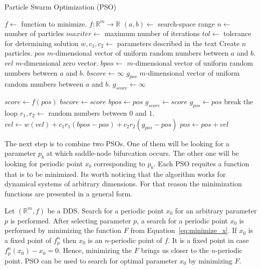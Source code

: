 \begin{algorithm}[!h]
    \caption{Particle Swarm Optimization (PSO)}
    \label{alg:pso}
    \begin{algorithmic}[1]
        \Statex $f \gets$ function to minimize. $f: \mathbb{R}^{m} \rightarrow \mathbb{R}$  
        \Statex $(a, b) \gets$ search-space range
        \Statex $n \gets$ number of particles
        \Statex $maxiter \gets$ maximum number of iterations
        \Statex $tol \gets$ tolerance for determining solution
        \Statex $w, c_{1}, c_{2} \gets$ parameters described in the text
        \State Create $n$ particles.
            \State $pos$ $m$-dimensional vector of uniform random numbers between $a$ and $b$.
            \State $vel$ $m$-dimensional zero vector.
            \State $bpos \gets$ $m$-dimensional vector of uniform random numbers between $a$ and $b$.
            \State $bscore \gets \infty$
        \EndFor
        \State $g_{pos}$ $m$-dimensional vector of uniform random numbers between $a$ and $b$.
        \State $g_{score} \gets \infty$

                \State $score \gets f(pos)$ 
                    \State $bscore \gets score$
                    \State $bpos \gets pos$
                \EndIf
                    \State $g_{score} \gets score$
                    \State $g_{pos} \gets pos$
                \EndIf
            \EndFor
                \State break the loop
            \EndIf
                \State $r_{1}, r_{2} \gets$ random numbers between $0$ and $1$.
                \State $vel \gets w(vel) + c_{1}r_{1}(bpos-pos) + c_{2}r_{2}(g_{pos}-pos)$
                \State $pos \gets pos + vel$
            \EndFor
        \EndFor
    \end{algorithmic}
\end{algorithm}

\par
The next step is to combine two PSOs.
One of them will be looking for a parameter $p_b$ at which saddle-node bifurcation occurs.
The other one will be looking for periodic point $x_b$ corresponding to $p_b$.
Each PSO requites a function that is to be minimized.
Its worth noticing that the algorithm works for dynamical systems of arbitrary dimensions.
For that reason the minimization functions are presented in a general form.
\par
Let $(\mathbb{R}^{m}, f)$ be a DDS.
Search for a periodic point $x_0$ for an arbitrary parameter $p$ is performed.
After selecting parameter $p$, a search for a periodic point $x_0$ is performed by minimizing the function $F$ from Equation~\eqref{eq:minimize_x}.
If $x_0$ is a fixed point of $f^{n}_{p}$ then $x_0$ is an $n$-periodic point of $f$.
It is a fixed point in case $f^{n}_{p}(x_0)-x_0 = 0$.
Hence, minimizing the $F$ brings us closer to the $n$-periodic point.
PSO can be used to search for optimal parameter $x_0$ by minimizing $F$.

